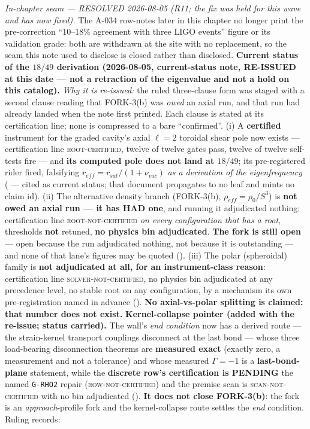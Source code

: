 \emph{In-chapter seam --- RESOLVED 2026-08-05 (R11; the fix was held for this wave and has now fired).} The A-034 row-notes later in this chapter no longer print the pre-correction ``10--18\% agreement with three LIGO events'' figure or its validation grade: both are withdrawn at the site with no replacement, so the seam this note used to disclose is closed rather than disclosed. \textbf{Current status of the $18/49$ derivation (2026-08-05, current-status note, \textbf{RE-ISSUED} at this date --- not a retraction of the eigenvalue and not a hold on this catalog).} \emph{Why it is re-issued:} the ruled three-clause form was staged with a second clause reading that FORK-3(b) was \emph{owed} an axial run, and that run had already landed when the note first printed. Each clause is stated at its certification line; none is compressed to a bare ``confirmed''. (i) A \textbf{certified} instrument for the graded cavity's axial $\ell = 2$ toroidal shear pole now exists --- certification line \textsc{root-certified}, twelve of twelve gates pass, twelve of twelve self-tests fire --- and \textbf{its computed pole does not land at $18/49$}; its pre-registered rider fired, falsifying $r_{eff} = r_{sat}/(1 + \nu_{vac})$ \emph{as a derivation of the eigenfrequency} ( --- cited as current status; that document propagates to no leaf and mints no claim id). (ii) The alternative density branch (FORK-3(b), $\rho_{eff} = \rho_0/S^3$) is \textbf{not owed an axial run --- it has HAD one}, and running it adjudicated nothing: certification line \textsc{root-not-certified} \emph{on every configuration that has a root}, thresholds \textbf{not} retuned, \textbf{no physics bin adjudicated}. \textbf{The fork is still open} --- open because the run adjudicated nothing, not because it is outstanding --- and none of that lane's figures may be quoted (). (iii) The polar (spheroidal) family is \textbf{not adjudicated at all, for an instrument-class reason}: certification line \textsc{solver-not-certified}, no physics bin adjudicated at any precedence level, no stable root on any configuration, by a mechanism its own pre-registration named in advance (). \textbf{No axial-vs-polar splitting is claimed: that number does not exist.} \textbf{Kernel-collapse pointer (added with the re-issue; status carried).} The wall's \emph{end condition} now has a derived route --- the strain-kernel transport couplings disconnect at the last bond --- whose three load-bearing disconnection theorems are \textbf{measured exact} (exactly zero, a measurement and not a tolerance) and whose measured $\Gamma = -1$\gammaundeclared{} is a \textbf{last-bond-plane} statement, while the \textbf{discrete row's certification is PENDING} the named \texttt{G-RHO2} repair (\textsc{row-not-certified}) and the premise scan is \textsc{scan-not-certified} with no bin adjudicated (). \textbf{It does not close FORK-3(b)}: the fork is an \emph{approach}-profile fork and the kernel-collapse route settles the \emph{end} condition. Ruling records: 